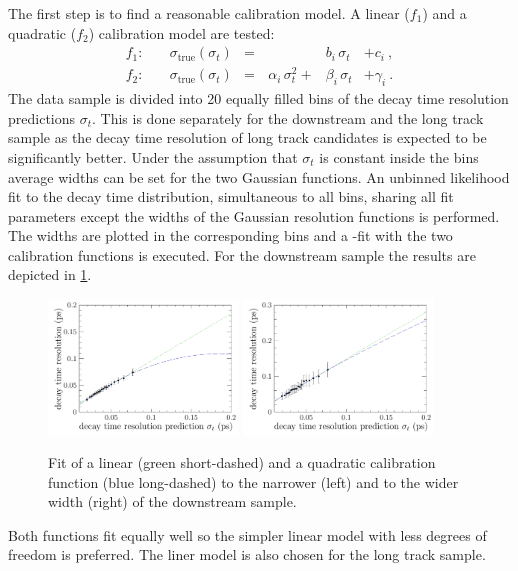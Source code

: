 The first step is to find a reasonable calibration model. A linear ($f_1$) and
a quadratic ($f_2$) calibration model are tested:
\begin{equation}
\begin{aligned}
f_1:&\quad \sigma_{\text{true}}(\sigma_t) &=&  &b_i\,\sigma_t &+ c_i \ , \\
f_2:&\quad \sigma_{\text{true}}(\sigma_t) &=&\, \alpha_i\,\sigma_t^2 + &\beta_i\,\sigma_t &+ \gamma_i \ .
\end{aligned}
\label{eq:resolutioncalibfunctions}
\end{equation}
%
The data sample is divided into \num{20} equally filled bins of the decay time
resolution predictions $\sigma_t$. This is done separately for the downstream
and the long track sample as the decay time resolution of long track
candidates is expected to be significantly better. Under the assumption that
$\sigma_t$ is constant inside the bins average widths can be set for the two
Gaussian functions. An unbinned likelihood fit to the decay time distribution,
simultaneous to all bins, sharing all fit parameters except the widths of the
Gaussian resolution functions is performed. The widths are plotted in the
corresponding bins and a \chisq-fit with the two calibration functions is
executed. For the downstream sample the results are depicted in
\cref{fig:CalibrationOffsetResolution_DD}.
%
\begin{figure}[!htb]
\centering
  \includegraphics[width=0.45\textwidth]{06-Bd2JpsiKS/tikz/pdf/ResolutionCalibration_1_DD.pdf}
  \includegraphics[width=0.45\textwidth]{06-Bd2JpsiKS/tikz/pdf/ResolutionCalibration_2_DD.pdf}
\caption{Fit of a linear (green short-dashed) and a quadratic calibration
function (blue long-dashed) to the narrower (left) and to the wider width
(right) of the downstream sample.}
\label{fig:CalibrationOffsetResolution_DD}
\end{figure}
%
Both functions fit equally well so the simpler linear model with less degrees
of freedom is preferred. The liner model is also chosen for the long track
sample.

